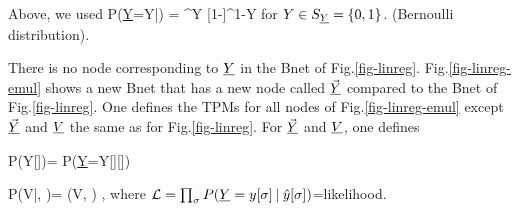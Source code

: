 Above, we used 
\beq
P(\ul{Y}=Y|) = ^{Y}
[1-]^{1-Y}
\eeq
for $Y\in S_{\underline{Y}}=\{0,1\}$. (Bernoulli distribution).

There is no node corresponding to $\underline{Y}$
in the Bnet of Fig.\ref{fig-linreg}.
Fig.\ref{fig-linreg-emul} shows a new Bnet
that has a new node called $\vec{\underline{Y}}$
compared to the Bnet of Fig.\ref{fig-linreg}.
One defines the TPMs
for all nodes of Fig.\ref{fig-linreg-emul}
except $\vec{\underline{Y}}$ and $\underline{V}$ the same
as for Fig.\ref{fig-linreg}. For $\vec{\underline{Y}}$
and $\underline{V}$, one defines

\beq\color{blue}
P(Y[\sigma]\cond {})=
P(\ul{Y}=Y[\sigma]\cond {}[\sigma])
\eeq

\beq\color{blue}
P(V|, \vecy)=
\delta(V, \ln \call)
\;,
\eeq
where ${\cal L} =\prod_\sigma P(\underline{Y}=y[\sigma]{\:\mathbf{|}\:} \hat{y}[\sigma] )$=likelihood.



